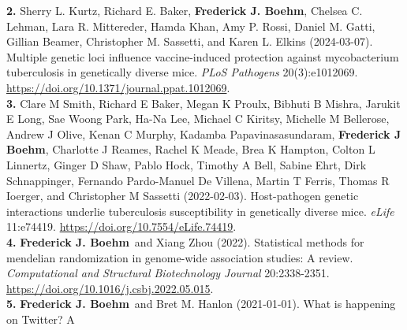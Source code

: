\documentclass[
  10pt,
]
{article}
\begin{document}
\textbf{2.} \normalsize \normalsize Sherry L. Kurtz\normalsize ,
\normalsize Richard E. Baker\normalsize ,
\textbf{\normalsize Frederick J. Boehm}\normalsize , \normalsize Chelsea
C. Lehman\normalsize , \normalsize Lara R. Mittereder\normalsize ,
\normalsize Hamda Khan\normalsize , \normalsize Amy P.
Rossi\normalsize , \normalsize Daniel M. Gatti\normalsize ,
\normalsize Gillian Beamer\normalsize , \normalsize Christopher M.
Sassetti\normalsize , and \normalsize Karen L. Elkins (2024-03-07).
Multiple genetic loci influence vaccine-induced protection against
mycobacterium tuberculosis in genetically diverse mice. \emph{PLoS
Pathogens} 20(3):e1012069.
\url{https://doi.org/10.1371/journal.ppat.1012069}.\\
\textbf{3.} \normalsize \normalsize Clare M Smith\normalsize ,
\normalsize Richard E Baker\normalsize , \normalsize Megan K
Proulx\normalsize , \normalsize Bibhuti B Mishra\normalsize ,
\normalsize Jarukit E Long\normalsize , \normalsize Sae Woong
Park\normalsize , \normalsize Ha-Na Lee\normalsize , \normalsize Michael
C Kiritsy\normalsize , \normalsize Michelle M Bellerose\normalsize ,
\normalsize Andrew J Olive\normalsize , \normalsize Kenan C
Murphy\normalsize , \normalsize Kadamba Papavinasasundaram\normalsize ,
\textbf{\normalsize Frederick J Boehm}\normalsize ,
\normalsize Charlotte J Reames\normalsize , \normalsize Rachel K
Meade\normalsize , \normalsize Brea K Hampton\normalsize ,
\normalsize Colton L Linnertz\normalsize , \normalsize Ginger D
Shaw\normalsize , \normalsize Pablo Hock\normalsize ,
\normalsize Timothy A Bell\normalsize , \normalsize Sabine
Ehrt\normalsize , \normalsize Dirk Schnappinger\normalsize ,
\normalsize Fernando Pardo-Manuel De Villena\normalsize ,
\normalsize Martin T Ferris\normalsize , \normalsize Thomas R
Ioerger\normalsize , and \normalsize Christopher M Sassetti
(2022-02-03). Host-pathogen genetic interactions underlie tuberculosis
susceptibility in genetically diverse mice. \emph{eLife} 11:e74419.
\url{https://doi.org/10.7554/eLife.74419}.\\
\textbf{4.}
\normalsize \textbf{\normalsize Frederick J. Boehm}\normalsize ~and
\normalsize Xiang Zhou (2022). Statistical methods for mendelian
randomization in genome-wide association studies: A review.
\emph{Computational and Structural Biotechnology Journal} 20:2338-2351.
\url{https://doi.org/10.1016/j.csbj.2022.05.015}.\\
\textbf{5.}
\normalsize \textbf{\normalsize Frederick J. Boehm}\normalsize ~and
\normalsize Bret M. Hanlon (2021-01-01). What is happening on Twitter? A
\end{document}
